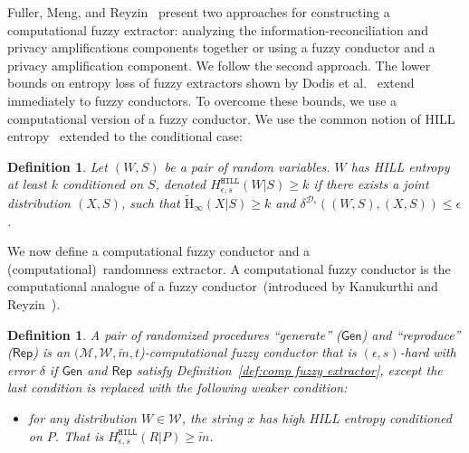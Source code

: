 \documentclass[11pt]{article}
\newcommand{\apref}[1]{\mbox{Appendix~\ref{#1}}}
\newcommand{\defref}[1]{\mbox{Definition~\ref{#1}}}
\newcommand{\class}[1]{{\ensuremath{\mathsf{#1}}}}
\newcommand{\gen}{\ensuremath{\class{Gen}}\xspace}
\newcommand{\rep}{\ensuremath{\class{Rep}}\xspace}
\newcommand{\hill}{\ensuremath{\mathtt{HILL}}\xspace}
\newcommand{\Hav}{\tilde{\mathrm{H}}_\infty}
\newtheorem{definition}[theorem]{Definition}
\begin{document}
Fuller, Meng, and Reyzin~\cite{fuller2013computational} present two approaches for constructing a computational fuzzy extractor: analyzing the information-reconciliation and privacy amplifications components together or using a fuzzy conductor and a privacy amplification component.  We follow the second approach.
The lower bounds on entropy loss of fuzzy extractors shown by Dodis et al.~\cite[Section C]{DBLP:journals/siamcomp/DodisORS08} extend immediately to fuzzy conductors.  %
To overcome these bounds, we use a computational version of a fuzzy conductor.
We use the common notion of HILL entropy~\cite{DBLP:journals/siamcomp/HastadILL99} extended to the conditional case:
\begin{definition}
\label{def:hill ent}
Let $(W, S)$ be a pair of random variables.  $W$ has
\emph{HILL entropy} at least $k$ conditioned on $S$,
denoted $H^{\hill}_{\epsilon, s}(W|S)\geq k$ if there exists a joint distribution $(X, S)$, such that $\Hav(X|S)\geq k$ and $\delta^{\mathcal{D}_{s}} ((W, S),(X,S))\leq \epsilon$.
\end{definition}
We now define a computational fuzzy conductor and a (computational)~randomness extractor.  A computational fuzzy conductor is the computational analogue of a fuzzy conductor~(introduced by Kanukurthi and Reyzin~\cite{KanukurthiR09}).
\begin{definition}
\label{def:comp fuzzy cond}
A pair of randomized procedures ``generate'' ($\gen$) and ``reproduce'' ($\rep$) is an $(\mathcal{M}, \mathcal{W}, \tilde{m}, t$)-computational fuzzy conductor that is $(\epsilon, s)$-hard with error $\delta$ if $\gen$ and $\rep$ satisfy \defref{def:comp fuzzy extractor}, except the last condition is replaced with the following weaker condition:
\begin{itemize}
\item for any distribution $W\in \mathcal{W}$, the string $x$ has high HILL entropy conditioned on $P$.  That is $H^{\hill}_{\epsilon, s}(R |P)\geq \tilde{m}$.
\end{itemize}
\end{definition}
\end{document}
